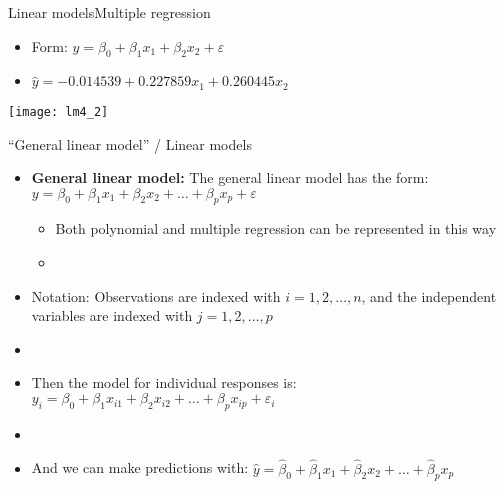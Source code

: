 \documentclass[xcolor=dvipsnames]{beamer}
\begin{document}
\begin{frame}{Linear models}{Multiple regression}
	\begin{itemize}
		\item Form: $y = \beta_0 + \beta_1 x_1 + \beta_2 x_2 + \varepsilon$
		\item $\hat{y} = -0.014539 +0.227859 x_1 + 0.260445  x_2 $
	\end{itemize}
	\vspace{-1.5mm}
	\begin{center}
		\texttt{[image: lm4\_2]}
	\end{center}
\end{frame}

\begin{frame}{``General linear model'' / Linear models}
	\begin{itemize}
		\item \textbf{General linear model:} The general linear model has the form: $y = \beta_0 + \beta_1 x_1 + \beta_2 x_2 + \hdots + \beta_p x_p + \varepsilon$ \pause
		\begin{itemize}
			\item Both polynomial and multiple regression can be represented in this way \pause
			\item[]
		\end{itemize}
		\item Notation: Observations are indexed with $i = 1, 2, \hdots, n$, and the independent variables are indexed with $j = 1, 2, \hdots, p$ \pause
		\item[]
		\item Then the model for individual responses is: $y_i = \beta_0 + \beta_1 x_{i1} + \beta_2 x_{i2} + \hdots + \beta_p x_{ip} + \varepsilon_i$ \pause
		\item[]
		\item And we can make predictions with: $\hat{y} = \hat{\beta}_0 + \hat{\beta}_1 x_1 + \hat{\beta}_2 x_2 + \hdots + \hat{\beta}_p x_p $
	\end{itemize}
\end{frame}
\end{document}
